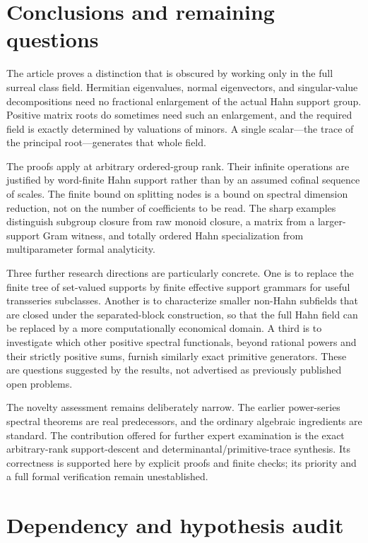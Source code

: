 \documentclass[11pt,letterpaper]{article}
\numberwithin{equation}{section}
\theoremstyle{definition}
\theoremstyle{remark}
\begin{document}
\section{Conclusions and remaining questions}
\label{sec:conclusion}

The article proves a distinction that is obscured by working only in the
full surreal class field. Hermitian eigenvalues, normal eigenvectors, and
singular-value decompositions need no fractional enlargement of the actual
Hahn support group. Positive matrix roots do sometimes need such an
enlargement, and the required field is exactly determined by valuations of
minors. A single scalar---the trace of the principal root---generates that
whole field.

The proofs apply at arbitrary ordered-group rank. Their infinite operations
are justified by word-finite Hahn support rather than by an assumed
cofinal sequence of scales. The finite bound on splitting nodes is a bound
on spectral dimension reduction, not on the number of coefficients to be
read. The sharp examples distinguish subgroup closure from raw monoid
closure, a matrix from a larger-support Gram witness, and totally ordered
Hahn specialization from multiparameter formal analyticity.

Three further research directions are particularly concrete. One is to
replace the finite tree of set-valued supports by finite effective support
grammars for useful transseries subclasses. Another is to characterize
smaller non-Hahn subfields that are closed under the separated-block
construction, so that the full Hahn field can be replaced by a more
computationally economical domain. A third is to investigate which other
positive spectral functionals, beyond rational powers and their strictly
positive sums, furnish similarly exact primitive generators. These are
questions suggested by the results, not advertised as previously published
open problems.

The novelty assessment remains deliberately narrow. The earlier
power-series spectral theorems are real predecessors, and the ordinary
algebraic ingredients are standard. The contribution offered for further
expert examination is the exact arbitrary-rank support-descent and
determinantal/primitive-trace synthesis. Its correctness is supported here
by explicit proofs and finite checks; its priority and a full formal
verification remain unestablished.

\appendix
\section{Dependency and hypothesis audit}
\label{app:audit}
\end{document}
